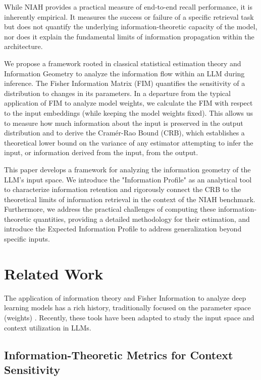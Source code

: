 \documentclass{article}
\theoremstyle{definition}
\begin{document}
While NIAH provides a practical measure of end-to-end recall performance, it is inherently empirical. It measures the success or failure of a specific retrieval task but does not quantify the underlying information-theoretic capacity of the model, nor does it explain the fundamental limits of information propagation within the architecture.

We propose a framework rooted in classical statistical estimation theory and Information Geometry \cite{amari2016information} to analyze the information flow within an LLM during inference. The Fisher Information Matrix (FIM) quantifies the sensitivity of a distribution to changes in its parameters. In a departure from the typical application of FIM to analyze model weights, we calculate the FIM with respect to the input embeddings (while keeping the model weights fixed). This allows us to measure how much information about the input is preserved in the output distribution and to derive the Cramér-Rao Bound (CRB), which establishes a theoretical lower bound on the variance of any estimator attempting to infer the input, or information derived from the input, from the output.

This paper develops a framework for analyzing the information geometry of the LLM's input space. We introduce the "Information Profile" as an analytical tool to characterize information retention and rigorously connect the CRB to the theoretical limits of information retrieval in the context of the NIAH benchmark. Furthermore, we address the practical challenges of computing these information-theoretic quantities, providing a detailed methodology for their estimation, and introduce the Expected Information Profile to address generalization beyond specific inputs.

\section{Related Work}


The application of information theory and Fisher Information to analyze deep learning models has a rich history, traditionally focused on the parameter space (weights) \cite{amari2016information}. Recently, these tools have been adapted to study the input space and context utilization in LLMs.

\subsection{Information-Theoretic Metrics for Context Sensitivity}
\end{document}
